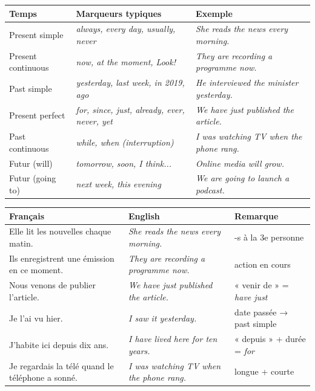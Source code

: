 \documentclass[11pt]{article}
\newcommand{\eng}[1]{\ifmmode\text{\textit{#1}}\else\begingroup\selectlanguage{english}\itshape #1\endgroup\fi}
\begin{document}
\begin{center}
\begin{tabularx}{\linewidth}{|l|X|X|}
\hline
\rowcolor{popblueL} \textbf{Temps} & \textbf{Marqueurs typiques} & \textbf{Exemple} \\
\hline
Present simple & \eng{always, every day, usually, never} & \eng{She reads the news every morning.} \\
\hline
Present continuous & \eng{now, at the moment, Look!} & \eng{They are recording a programme now.} \\
\hline
Past simple & \eng{yesterday, last week, in 2019, ago} & \eng{He interviewed the minister yesterday.} \\
\hline
Present perfect & \eng{for, since, just, already, ever, never, yet} & \eng{We have just published the article.} \\
\hline
Past continuous & \eng{while, when (interruption)} & \eng{I was watching TV when the phone rang.} \\
\hline
Futur (will) & \eng{tomorrow, soon, I think...} & \eng{Online media will grow.} \\
\hline
Futur (going to) & \eng{next week, this evening} & \eng{We are going to launch a podcast.} \\
\hline
\end{tabularx}
\end{center}

\begin{center}
\begin{tabularx}{\linewidth}{|X|X|X|}
\hline
\rowcolor{popgreenL} \textbf{Français} & \textbf{English} & \textbf{Remarque} \\
\hline
Elle lit les nouvelles chaque matin. & \eng{She reads the news every morning.} & -s à la 3e personne \\
\hline
Ils enregistrent une émission en ce moment. & \eng{They are recording a programme now.} & action en cours \\
\hline
Nous venons de publier l'article. & \eng{We have just published the article.} & « venir de » = \eng{have just} \\
\hline
Je l'ai vu hier. & \eng{I saw it yesterday.} & date passée → past simple \\
\hline
J'habite ici depuis dix ans. & \eng{I have lived here for ten years.} & « depuis » + durée = \eng{for} \\
\hline
Je regardais la télé quand le téléphone a sonné. & \eng{I was watching TV when the phone rang.} & longue + courte \\
\hline
\end{tabularx}
\end{center}
\end{document}

